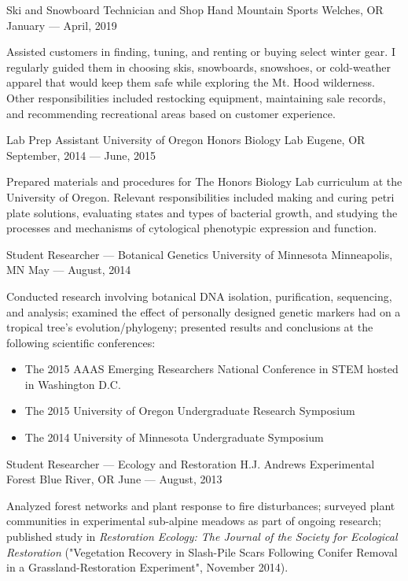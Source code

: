 \showoff
{Ski and Snowboard Technician and Shop Hand}
{Mountain Sports}
{Welches, OR}
{January --- April, 2019}

Assisted customers in finding, tuning, and renting or buying select winter gear. I regularly guided them in choosing skis, snowboards, snowshoes, or cold-weather apparel that would keep them safe while exploring the Mt. Hood wilderness. Other responsibilities included restocking equipment, maintaining sale records, and recommending recreational areas based on customer experience. 

\myBreak

\showoff
{Lab Prep Assistant}
{University of Oregon Honors Biology Lab}
{Eugene, OR}
{September, 2014 --- June, 2015}

Prepared materials and procedures for The Honors Biology Lab curriculum at the University of Oregon. Relevant responsibilities included making and curing petri plate solutions, evaluating states and types of bacterial growth, and studying the processes and mechanisms of cytological phenotypic expression and function.

\myBreak

\showoff
{Student Researcher --- Botanical Genetics}
{University of Minnesota}
{Minneapolis, MN}
{May --- August, 2014}

Conducted research involving botanical DNA isolation, purification, sequencing, and analysis; examined the effect of personally designed genetic markers had on a tropical tree’s evolution/phylogeny; presented results and conclusions at the following scientific conferences:

\begin{itemize}[label=$\triangleright$]
\item{The 2015 AAAS Emerging Researchers National Conference in STEM hosted in Washington D.C.}
\item{The 2015 University of Oregon Undergraduate Research Symposium}
\item{The 2014 University of Minnesota Undergraduate Symposium}
\end{itemize}

\myBreak

\showoff
{Student Researcher --- Ecology and Restoration}
{H.J. Andrews Experimental Forest}
{Blue River, OR}
{June --- August, 2013}

Analyzed forest networks and plant response to fire disturbances; surveyed plant communities in experimental sub-alpine meadows as part of ongoing research; published study in \textit{Restoration Ecology: The Journal of the Society for Ecological Restoration} ("Vegetation Recovery in Slash-Pile Scars Following Conifer Removal in a Grassland-Restoration Experiment", November 2014).

